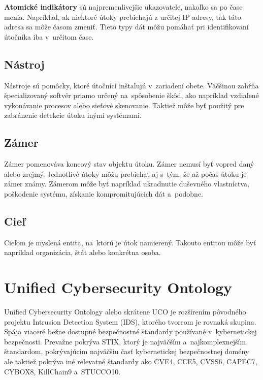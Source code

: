 \documentclass[12pt, a4paper, oneside]{book}
\begin{document}
\textbf{Atomické indikátory} sú najpremenlivejšie ukazovatele, nakoľko sa po čase menia. Napríklad, ak niektoré útoky prebiehajú z určitej IP adresy, tak táto adresa sa môže časom zmeniť. Tieto typy dát môžu pomáhať pri identifikovaní útočníka iba v~určitom čase.


\subsection{Nástroj}
Nástroje sú pomôcky, ktoré útočníci inštalujú v~zariadení obete. Väčšinou zahŕňa špecializovaný softvér priamo určený na~spôsobenie škôd, ako napríklad vzdialené vykonávanie procesov alebo sieťové skenovanie. Taktiež môže byť použitý pre zabránenie detekcie útoku inými systémami.


\subsection{Zámer}
Zámer pomenováva koncový stav objektu útoku. Zámer nemusí byť vopred daný alebo zrejmý. Jednotlivé útoky môžu prebiehať aj s~tým, že až počas útoku je zámer známy. Zámerom môže byť napríklad ukradnutie duševného vlastníctva, poškodenie systému, získanie kompromitujúcich dát a~podobne.


\subsection{Cieľ}
Cieľom je myslená entita, na~ktorú je útok namierený. Takouto entitou môže byť napríklad organizácia, štát alebo konkrétna osoba.





\section{Unified Cybersecurity Ontology}
Unified Cybersecurity Ontology \citep{SyedPFMJ16} alebo skrátene UCO je rozšírením pôvodného projektu Intrusion Detection System (IDS), ktorého tvorcom je rovnaká skupina. Spája viaceré bežne dostupné bezpečnostné štandardy používané v~kybernetickej bezpečnosti. Prevažne pokrýva STIX, ktorý je najväčším a~najkomplexnejším štandardom, pokrývajúcim najväčšiu časť kybernetickej bezpečnostnej domény ale taktiež pokrýva iné relevatné štandardy ako CVE4, CCE5, CVSS6, CAPEC7, CYBOX8, KillChain9 a~STUCCO10.
\end{document}
